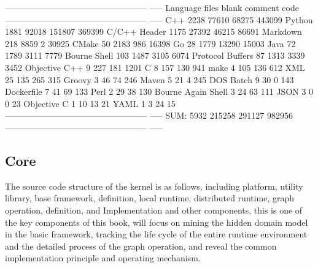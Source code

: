 \begin{content}
\begin{leftbar}
\begin{python}[caption={TensorFlowCode Stats}]
-------------------------------------------------- -----
Language             files    blank    comment    code
-------------------------------------------------- -----
C++                   2238    77610     68275    443099
Python                1881    92018    151807    369399
C/C++ Header          1175    27392     46215     86691
Markdown 218 8859 2 30925
CMake                   50     2183       986     16398
Go                      28     1779     13290     15003
Java                    72     1789      3111      7779
Bourne Shell           103     1487      3105      6074
Protocol Buffers        87     1313      3339      3452
Objective C++            9      227       181      1201
C                        8      157       130       941
make                     4      105       136       612
XML                     25      135       265       315
Groovy                   3       46        74       246
Maven                    5       21         4       245
DOS Batch 9 30 0 143
Dockerfile               7       41        69       133
Perl                     2       29        38       130
Bourne Again Shell       3       24        63       111
JSON                     3        0         0        23
Objective C              1       10        13        21
YAML 1 3 24 15
-------------------------------------------------- -----
SUM:                  5932   215258    291127    982956
-------------------------------------------------- -----
\end{python}
\end{leftbar}

\subsection{Core}

The source code structure of the kernel is as follows, including platform, utility library, base framework,  definition, local runtime, distributed runtime, graph operation,  definition, and  Implementation and other components, this is one of the key components of this book, will focus on mining the hidden domain model in the basic framework, tracking the life cycle of the entire runtime environment and the detailed process of the graph operation, and reveal the common   implementation principle and operating mechanism.


\end{content}
